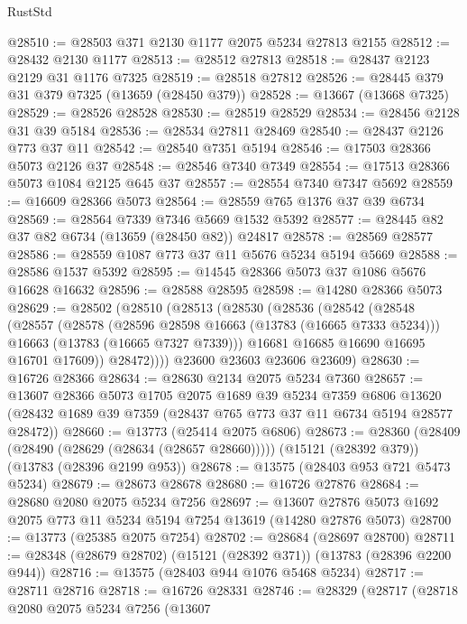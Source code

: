 \begin{lexlean}{RustStd}
\begin{coremodule}
@28510 := @28503 @371 @2130 @1177 @2075 @5234 @27813 @2155
@28512 := @28432 @2130 @1177
@28513 := @28512 @27813
@28518 := @28437 @2123 @2129 @31 @1176 @7325
@28519 := @28518 @27812
@28526 := @28445 @379 @31 @379 @7325 (@13659 (@28450 @379))
@28528 := @13667 (@13668 @7325)
@28529 := @28526 @28528
@28530 := @28519 @28529
@28534 := @28456 @2128 @31 @39 @5184
@28536 := @28534 @27811 @28469
@28540 := @28437 @2126 @773 @37 @11
@28542 := @28540 @7351 @5194
@28546 := @17503 @28366 @5073 @2126 @37
@28548 := @28546 @7340 @7349
@28554 := @17513 @28366 @5073 @1084 @2125 @645 @37
@28557 := @28554 @7340 @7347 @5692
@28559 := @16609 @28366 @5073
@28564 := @28559 @765 @1376 @37 @39 @6734
@28569 := @28564 @7339 @7346 @5669 @1532 @5392
@28577 := @28445 @82 @37 @82 @6734 (@13659 (@28450 @82)) @24817
@28578 := @28569 @28577
@28586 := @28559 @1087 @773 @37 @11 @5676 @5234 @5194 @5669
@28588 := @28586 @1537 @5392
@28595 := @14545 @28366 @5073 @37 @1086 @5676 @16628 @16632
@28596 := @28588 @28595
@28598 := @14280 @28366 @5073
@28629 := @28502
    (@28510
      (@28513
        (@28530
          (@28536
            (@28542
              (@28548
                (@28557
                  (@28578
                    (@28596 @28598 @16663 (@13783 (@16665 @7333 @5234)))
                    @16663
                    (@13783 (@16665 @7327 @7339)))
                  @16681
                  @16685
                  @16690
                  @16695
                  @16701
                  @17609))
              @28472))))
      @23600
      @23603
      @23606
      @23609)
@28630 := @16726 @28366
@28634 := @28630 @2134 @2075 @5234 @7360
@28657 := @13607
    @28366
    @5073
    @1705
    @2075
    @1689
    @39
    @5234
    @7359
    @6806
    @13620
    (@28432 @1689 @39 @7359 (@28437 @765 @773 @37 @11 @6734 @5194 @28577 @28472))
@28660 := @13773 (@25414 @2075 @6806)
@28673 := @28360
    (@28409 (@28490 (@28629 (@28634 (@28657 @28660)))))
    (@15121 (@28392 @379))
    (@13783 (@28396 @2199 @953))
@28678 := @13575 (@28403 @953 @721 @5473 @5234)
@28679 := @28673 @28678
@28680 := @16726 @27876
@28684 := @28680 @2080 @2075 @5234 @7256
@28697 := @13607 @27876 @5073 @1692 @2075 @773 @11 @5234 @5194 @7254 @13619 (@14280 @27876 @5073)
@28700 := @13773 (@25385 @2075 @7254)
@28702 := @28684 (@28697 @28700)
@28711 := @28348 (@28679 @28702) (@15121 (@28392 @371)) (@13783 (@28396 @2200 @944))
@28716 := @13575 (@28403 @944 @1076 @5468 @5234)
@28717 := @28711 @28716
@28718 := @16726 @28331
@28746 := @28329
    (@28717
      (@28718
        @2080
        @2075
        @5234
        @7256
        (@13607

\end{coremodule}
\end{lexlean}
